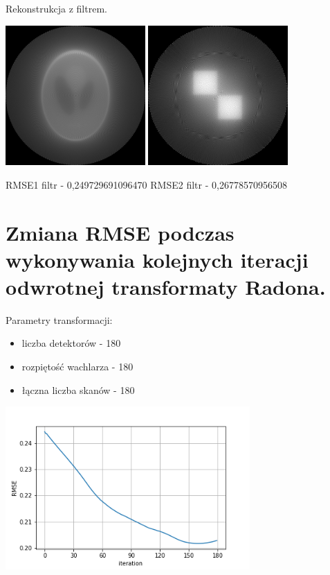 \documentclass[paper=a4, fontsize=11pt]{scrartcl}
\begin{document}
	
		\begin{center}
		Rekonstrukcja z filtrem.
		
		
		\includegraphics[width=0.4\textwidth]{reconstructed_filtered1.png}
		\includegraphics[width=0.4\textwidth]{reconstructed_filtered2.png}
		
		RMSE1 filtr - 0,249729691096470\hspace{1.5cm} RMSE2 filtr - 0,26778570956508
	\end{center}
	
	\section{Zmiana RMSE podczas wykonywania kolejnych iteracji odwrotnej transformaty Radona.}
	
	
	Parametry transformacji:
	\begin{itemize}
		\item liczba detektorów - 180
		\item rozpiętość wachlarza - 180\degree
		\item łączna liczba skanów - 180
	\end{itemize}
	\begin{center}
		\includegraphics[width=0.7\textwidth]{change.png}
	\end{center}
\end{document}
